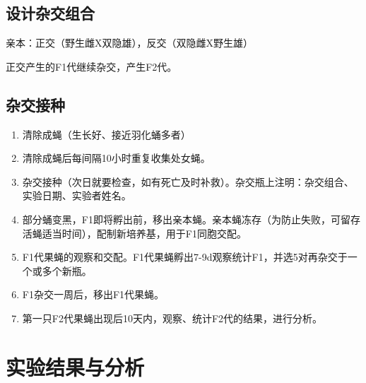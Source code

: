 \documentclass[UTF8]{article}
\begin{document}
    \subsection{设计杂交组合}
    亲本：正交（野生雌X双隐雄），反交（双隐雌X野生雄）

    正交产生的F1代继续杂交，产生F2代。
    \subsection{杂交接种}
    \begin{enumerate}
      \item 清除成蝇（生长好、接近羽化蛹多者）
      \item 清除成蝇后每间隔10小时重复收集处女蝇。
      \item 杂交接种（次日就要检查，如有死亡及时补救）。杂交瓶上注明：杂交组合、实验日期、实验者姓名。
      \item 部分蛹变黑，F1即将孵出前，移出亲本蝇。亲本蝇冻存（为防止失败，可留存活蝇适当时间），配制新培养基，用于F1同胞交配。
      \item F1代果蝇的观察和交配。F1代果蝇孵出7-9d观察统计F1，并选5对再杂交于一个或多个新瓶。
      \item F1杂交一周后，移出F1代果蝇。
      \item 第一只F2代果蝇出现后10天内，观察、统计F2代的结果，进行分析。
    \end{enumerate}
    \section{实验结果与分析}
\end{document}

